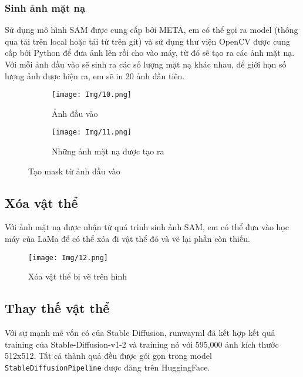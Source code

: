 \documentclass[12pt]{report}
\begin{document}
\subsubsection*{Sinh ảnh mặt nạ}

Sử dụng mô hình SAM được cung cấp bởi META, em có thể gọi ra model (thông qua tải trên local hoặc tải từ trên git) và sử dụng thư viện OpenCV được cung cấp bởi Python để đưa ảnh lên rồi cho vào máy, từ đó sẽ tạo ra các ảnh mặt nạ. Với mỗi ảnh đầu vào sẽ sinh ra các số lượng mặt nạ khác nhau, để giới hạn số lượng ảnh được hiện ra, em sẽ in 20 ảnh đầu tiên.

\begin{figure}[h]
    \centering
    \begin{subfigure}[b]{0.48\textwidth}
        \texttt{[image: Img/10.png]}
        \caption{Ảnh đầu vào}
        \label{fig:image1}
    \end{subfigure}
    \hfill
    \begin{subfigure}[b]{0.48\textwidth}
        \texttt{[image: Img/11.png]}
        \caption{Những ảnh mặt nạ được tạo ra}
        \label{fig:image2}
    \end{subfigure}
    \caption{Tạo mask từ ảnh đầu vào}
    \label{fig:combined}
\end{figure}

\subsection{Xóa vật thể}

Với ảnh mặt nạ được nhận từ quá trình sinh ảnh SAM, em có thể đưa vào học máy của LaMa để có thể xóa đi vật thể đó và vẽ lại phần còn thiếu.

\begin{figure}[H]
    \centering
    \texttt{[image: Img/12.png]}
    \caption{Xóa vật thể bị vẽ trên hình}
\end{figure}

\subsection{Thay thế vật thể}

Với sự mạnh mẽ vốn có của Stable Diffusion, runwayml đã kết hợp kết quả training của Stable-Diffusion-v1-2 và training nó với 595,000 ảnh kích thước 512x512. Tất cả thành quả đều được gói gọn trong model \texttt{StableDiffusionPipeline} được đăng trên HuggingFace.
\end{document}
